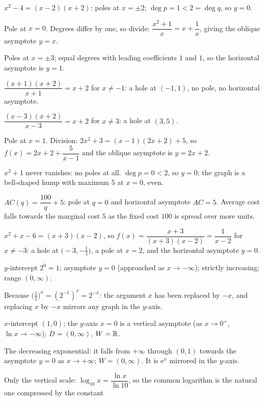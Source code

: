\begin{solutions}
  \item $x^{2}-4=(x-2)(x+2)$: poles at $x=\pm2$; $\deg p=1<2=\deg q$, so
        $y=0$.
  \item Pole at $x=0$. Degrees differ by one, so divide:
        $\dfrac{x^{2}+1}{x}=x+\dfrac{1}{x}$, giving the oblique asymptote
        $y=x$.
  \item Poles at $x=\pm3$; equal degrees with leading coefficients $1$ and
        $1$, so the horizontal asymptote is $y=1$.
  \item $\dfrac{(x+1)(x+2)}{x+1}=x+2$ for $x\neq-1$: a hole at $(-1,1)$,
        no pole, no horizontal asymptote.
  \item $\dfrac{(x-3)(x+2)}{x-3}=x+2$ for $x\neq3$: a hole at $(3,5)$.
  \item Pole at $x=1$. Division: $2x^{2}+3=(x-1)(2x+2)+5$, so
        $f(x)=2x+2+\dfrac{5}{x-1}$ and the oblique asymptote is $y=2x+2$.
  \item $x^{2}+1$ never vanishes: no poles at all. $\deg p=0<2$, so
        $y=0$; the graph is a bell-shaped hump with maximum $5$ at $x=0$,
        even.
  \item $AC(q)=\dfrac{100}{q}+5$: pole at $q=0$ and horizontal asymptote
        $AC=5$. Average cost falls towards the marginal cost $5$ as the
        fixed cost $100$ is spread over more units.
  \item $x^{2}+x-6=(x+3)(x-2)$, so
        $f(x)=\dfrac{x+3}{(x+3)(x-2)}=\dfrac{1}{x-2}$ for $x\neq-3$:
        a hole at $\bigl(-3,-\tfrac15\bigr)$, a pole at $x=2$, and the
        horizontal asymptote $y=0$.
  \item $y$-intercept $2^{0}=1$; asymptote $y=0$ (approached as
        $x\to-\infty$); strictly increasing; range $(0,\infty)$.
  \item Because $\bigl(\tfrac12\bigr)^{x}=(2^{-1})^{x}=2^{-x}$: the
        argument $x$ has been replaced by $-x$, and replacing $x$ by $-x$
        mirrors any graph in the $y$-axis.
  \item $x$-intercept $(1,0)$; the $y$-axis $x=0$ is a vertical asymptote
        (as $x\to0^{+}$, $\ln x\to-\infty$); $D=(0,\infty)$, $W=\mathbb{R}$.
  \item The decreasing exponential: it falls from $+\infty$ through
        $(0,1)$ towards the asymptote $y=0$ as $x\to+\infty$;
        $W=(0,\infty)$. It is $\mathrm{e}^{x}$ mirrored in the $y$-axis.
  \item Only the vertical scale: $\log_{10}x=\dfrac{\ln x}{\ln 10}$, so the
        common logarithm is the natural one compressed by the constant

\end{solutions}
